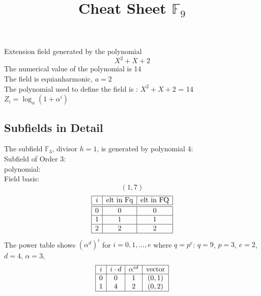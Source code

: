 \documentclass[12pt]{article}
\newcommand\setTBstruts{\def\T{\rule{0pt}{2.6ex}}%
\def\B{\rule[-1.2ex]{0pt}{0pt}}}
\begin{document}
 
\setTBstruts



{\allowdisplaybreaks%






\title{Cheat Sheet ${\mathbb F}_{9}$}
\author{}%
\maketitle%
%



Extension field generated by the polynomial
$$
X^2+X+2
$$
The numerical value of the polynomial is 14\\
The field is equianharmonic, $a = 2$\\
The polynomial used to define the field is : $X^2+X+2$ = 14\\
$Z_i = \log_\alpha (1 + \alpha^i)$\\
\subsection*{Subfields in Detail}
The subfield ${\mathbb F}_{3}$, divisor $h=1$, is generated by polynomial 4:\\
Subfield of Order $3$:\\
polynomial: \\
Field basis:\\
$$
( 1, 7 )
$$
$$
\begin{array}{|c|c|c|}
\hline
i & \mbox{elt in Fq} & \mbox{elt in FQ} \\
\hline
\hline
0 & 0 & 0\\
\hline
1 & 1 & 1\\
\hline
2 & 2 & 2\\
\hline
\end{array}
$$
The power table shows $(\alpha^d)^i$ for $i=0,1,\ldots,e$ where $q=p^{e}$:
$q = 9$, 
$p = 3$, 
$e = 2$, 
$d = 4$, 
$\alpha = 3$, 
$$
\begin{array}{|c|c|c|c|}
\hline
i & i\cdot d  & \alpha^{id} & \mbox{vector} \\
\hline
0 & 0 & 1 & (0,1)\\
1 & 4 & 2 & (0,2)\\
\hline
\end{array}
$$

}
\end{document}
